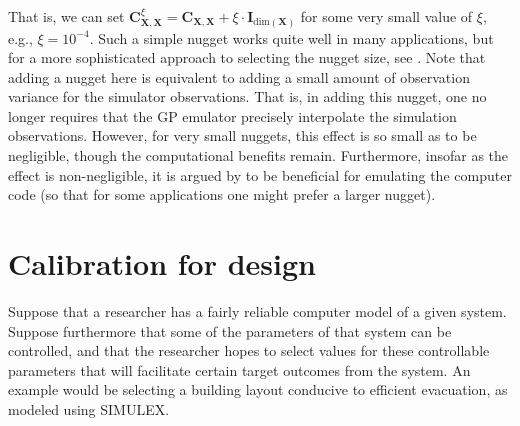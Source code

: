\documentclass{article}
\begin{document}
That is, we can set $\mathbf C_{\mathbf X,\mathbf X}^\xi= \mathbf C_{\mathbf X,\mathbf X} + \xi \cdot \mathbf I_{\mathrm{dim}(\mathbf X)}$ for some very small value of $\xi$, e.g., $\xi=10^{-4}$. 
Such a simple nugget works quite well in many applications, but for a more sophisticated approach to selecting the nugget size, see \cite{Ranjan2011}. 
Note that adding a nugget here is equivalent to adding a small amount of observation variance for the simulator observations. 
That is, in adding this nugget, one no longer requires that the GP emulator precisely interpolate the simulation observations. 
However, for very small nuggets, this effect is so small as to be negligible, though the computational benefits remain. 
Furthermore, insofar as the effect is non-negligible, it is argued by \cite{Gramacy2012} to be beneficial for emulating the computer code (so that for some applications one might prefer a larger nugget).


\section{Calibration for design}\label{calib_for_design}


Suppose that a researcher has a fairly reliable computer model of a given system. Suppose furthermore that some of the parameters of that system can be controlled, and that the researcher hopes to select values for these controllable parameters that will facilitate certain target outcomes from the system. An example would be selecting a building layout conducive to efficient evacuation, as modeled using SIMULEX.
\end{document}
